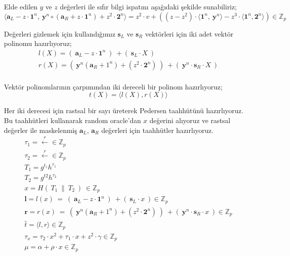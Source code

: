 \documentclass[a4paper,11pt]{article}
\begin{document}
Elde edilen $y$ ve $z$ değerleri ile sıfır bilgi ispatını aşağıdaki şekilde sunabiliriz;
$$\langle \mathbf{a}_{L} -z\cdot \mathbf{1}^{n} ,\ \mathbf{y}^{n} \circ \left(\mathbf{a}_{R} +z\cdot \mathbf{1}^{n}\right) +z^{2} \cdot \mathbf{2}^{n} \rangle =z^{2} \cdot v+\left(\left( z-z^{2}\right) \cdot \langle \mathbf{1}^{n} ,\ \mathbf{y}^{n} \rangle -z^{3} \cdot \langle \mathbf{1}^{n} ,\mathbf{2}^{n} \rangle \right) \in \mathbb{Z}_{p}$$

Değerleri gizlemek için kullandığımız $\mathbf{s}_{L}$ ve $\mathbf{s}_{R}$ vektörleri için iki adet vektör polinomu hazırlıyoruz;
$$
\begin{array}{l}
l(X)=(\ \mathbf{a}_{L} -z\cdot \mathbf{1}^{n} \ )\ +(\ \mathbf{s}_{L} \cdot X\ )\\
r(X)=(\ \mathbf{y}^{n} (\mathbf{a}_{R} +1^{n}) +(z^{2} \cdot \mathbf{2}^{n} )\ )\ +(\ \mathbf{y}^{n} \cdot \mathbf{s}_{R} \cdot X\ )\\
\end{array}
$$

Vektör polinomlarının çarpımından iki dereceli bir polinom hazırlıyoruz;
$$t(X)=\langle l(X),r(X)\rangle$$

Her iki derecesi için rastsal bir sayı üreterek Pedersen taahhütünü hazırlıyoruz. Bu taahhütleri kullanarak random oracle'dan $x$ değerini alıyoruz ve rastsal değerler ile maskelenmiş $\mathbf{a}_{L}$, $\mathbf{a}_{R}$ değerleri için taahhütler hazırlıyoruz.
$$
\begin{array}{l}
\tau _{1} =\xleftarrow{r} \in \mathbb{Z}_{p}\\
\tau _{2} =\xleftarrow{r} \in \mathbb{Z}_{p}\\
T_{1} =g^{t_{1}} h^{\tau _{1}}\\
T_{2} =g^{t2} h^{\tau _{2}}\\
x=H(\ T_{1} \ \| \ T_{2} \ )\ \in \mathbb{Z}_{p}\\
\mathbf{l} =l( x) \ =\ (\ \mathbf{a}_{L} -z\cdot \mathbf{1}^{n} \ )\ +(\ \mathbf{s}_{L} \cdot x\ )\in \mathbb{Z}_{p}\\
\mathbf{r} =r( x) \ =\ (\ \mathbf{y}^{n} (\mathbf{a}_{R} +1^{n}) +(z^{2} \cdot \mathbf{2}^{n} )\ )\ +(\ \mathbf{y}^{n} \cdot \mathbf{s}_{R} \cdot x\ )\in \mathbb{Z}_{p}\\
\hat{t} =\langle l,r\rangle \in \mathbb{Z}_{p} \\
\tau _{x} =\tau _{2} \cdot x^{2} +\tau _{1} \cdot x+z^{2} \cdot \gamma \in \mathbb{Z}_{p}\\
\mu =\alpha +\rho \cdot x\in \mathbb{Z}_{p}
\end{array}
$$
\end{document}
